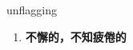 
\begin{frame}
{\huge unflagging}
\begin{center}
\begin{enumerate}\Large
  \item \textbf{不懈的，不知疲倦的}
\end{enumerate}
\end{center}
\end{frame}
